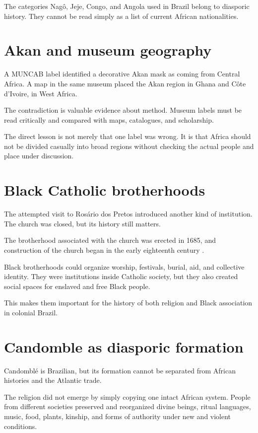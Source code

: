 The categories Nag\^o, Jeje, Congo, and
Angola used in Brazil belong to diasporic
history.  They cannot be read simply as a
list of current African nationalities.

\section{Akan and museum geography}
\label{section-akan-geography}

A MUNCAB label identified a decorative
Akan mask as coming from Central Africa.
A map in the same museum placed the Akan
region in Ghana and C\^ote d'Ivoire, in
West Africa.

The contradiction is valuable evidence
about method.  Museum labels must be read
critically and compared with maps,
catalogues, and scholarship.

The direct lesson is not merely that one
label was wrong.  It is that Africa should
not be divided casually into broad regions
without checking the actual people and
place under discussion.

\section{Black Catholic brotherhoods}
\label{section-black-brotherhoods}

The attempted visit to Ros\'ario dos Pretos
introduced another kind of institution.
The church was closed, but its history
still matters.

The brotherhood associated with the church
was erected in 1685, and construction of
the church began in the early eighteenth
century \cite{ipac-rosario}.

Black brotherhoods could organize worship,
festivals, burial, aid, and collective
identity.  They were institutions inside
Catholic society, but they also created
social spaces for enslaved and free Black
people.

This makes them important for the history
of both religion and Black association in
colonial Brazil.

\section{Candomble as diasporic formation}
\label{section-history-candomble}

Candombl\'e is Brazilian, but its formation
cannot be separated from African histories
and the Atlantic trade.

The religion did not emerge by simply
copying one intact African system.  People
from different societies preserved and
reorganized divine beings, ritual
languages, music, food, plants, kinship,
and forms of authority under new and
violent conditions.


